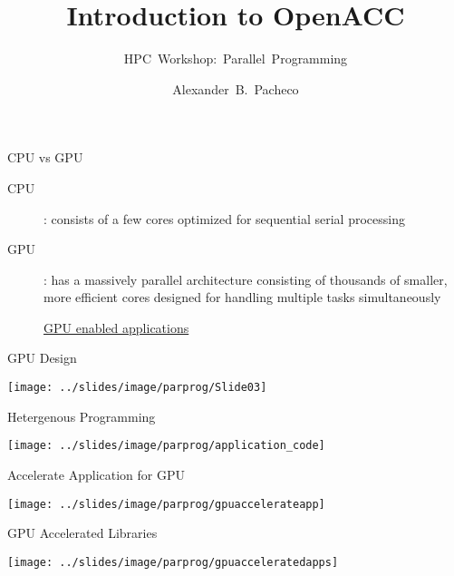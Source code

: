 \documentclass[10pt,t]{beamer}
\title[OpenACC]{Introduction to OpenACC}
\subtitle{HPC~Workshop:~Parallel~Programming}
\author{\large{Alexander~B.~Pacheco}}
\institute[Lehigh University Research Computing]{\href{http://researchcomputing.lehigh.edu}{Research~Computing}}
\date{}%
\begin{document}
\begin{frame}
  \titlepage
\end{frame}

\begin{frame}{CPU vs GPU}
  \begin{description}
    \item[CPU]: consists of a few cores optimized for sequential serial processing
    \item[GPU]: has a massively parallel architecture consisting of thousands of smaller, more efficient cores designed for handling multiple tasks simultaneously
    \item[] \href{http://www.nvidia.com/object/gpu-applications.html}{GPU enabled applications}
  \end{description}
\end{frame}

\begin{frame}{GPU Design}
  \vspace{0.25cm}
  \begin{center}
    \texttt{[image: ../slides/image/parprog/Slide03]}
  \end{center}
\end{frame}

\begin{frame}{Hetergenous Programming}
  \begin{center}
    \texttt{[image: ../slides/image/parprog/application\_code]}
  \end{center}
\end{frame}

\begin{frame}{Accelerate Application for GPU}
  \begin{center}
    \texttt{[image: ../slides/image/parprog/gpuaccelerateapp]}
  \end{center}
\end{frame}

\begin{frame}{GPU Accelerated Libraries}
  \begin{center}
    \texttt{[image: ../slides/image/parprog/gpuacceleratedapps]}
  \end{center}
\end{frame}
\end{document}
